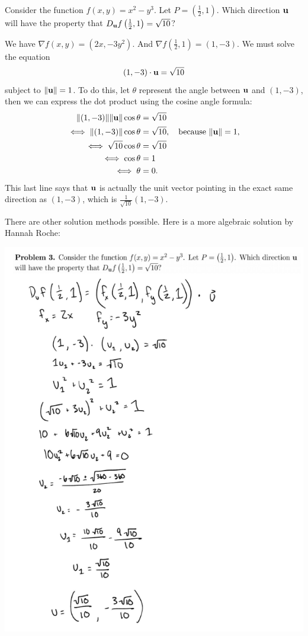 \begin{problem}
  Consider the function $f(x,y)=x^2-y^3$. Let $P=\left(\frac12,1\right)$. Which direction $\mathbf u$ will have the property that $D_\mathbf u f\left(\frac12,1\right)=\sqrt{10}$?
\end{problem}
\begin{solution}
  We have $\nabla f(x,y)=(2x,-3y^2)$. And $\nabla f(\frac12,1)=(1,-3)$. We must solve the equation
  \[(1,-3)\cdot\mathbf u=\sqrt{10}\]
  subject to $\|\mathbf u\|=1$. To do this, let $\theta$ represent the angle between $\mathbf u$ and $(1,-3)$, then we can express the dot product using the cosine angle formula:
  \begin{align*}
    \|(1,-3)\|\|\mathbf u\|\cos\theta&=\sqrt{10}\\
    \iff \|(1,-3)\|\cos\theta &=\sqrt{10},\quad\text{because }\|\mathbf u\|=1,\\
    \iff \sqrt{10}\cos\theta&=\sqrt{10}\\
    \iff\cos\theta&=1\\
    \iff \theta&=0.
  \end{align*}
  This last line says that $\mathbf u$ is actually the unit vector pointing in the exact same direction as $(1,-3)$, which is $\frac1{\sqrt{10}}(1,-3)$.

  There are other solution methods possible. Here is a more algebraic solution by Hannah Roche:

  \includegraphics[width=\textwidth]{nice/p5.3_hannah.png}
\end{solution}

